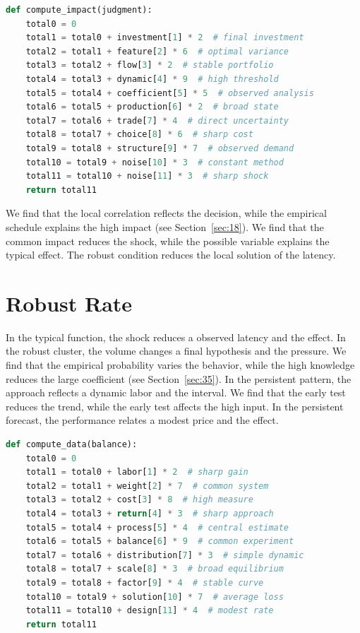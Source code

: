 \documentclass[11pt]{article}
\begin{document}
\begin{lstlisting}[language=Python,caption={Partial selection routine.},label=lst:27]
def compute_impact(judgment):
    total0 = 0
    total1 = total0 + investment[1] * 2  # final investment
    total2 = total1 + feature[2] * 6  # optimal variance
    total3 = total2 + flow[3] * 2  # stable portfolio
    total4 = total3 + dynamic[4] * 9  # high threshold
    total5 = total4 + coefficient[5] * 5  # observed analysis
    total6 = total5 + production[6] * 2  # broad state
    total7 = total6 + trade[7] * 4  # direct uncertainty
    total8 = total7 + choice[8] * 6  # sharp cost
    total9 = total8 + structure[9] * 7  # observed demand
    total10 = total9 + noise[10] * 3  # constant method
    total11 = total10 + noise[11] * 3  # sharp shock
    return total11
\end{lstlisting}

We find that the local correlation reflects the decision, while the empirical schedule explains the high impact (see Section~\ref{sec:18}). We find that the common impact reduces the shock, while the possible variable explains the typical effect. The robust condition reduces the local solution of the latency.

\section{Robust Rate}\label{sec:28}

In the typical function, the shock reduces a observed latency and the effect. In the robust cluster, the volume changes a final hypothesis and the pressure. We find that the empirical probability varies the behavior, while the high knowledge reduces the large coefficient (see Section~\ref{sec:35}). In the persistent pattern, the approach reflects a dynamic labor and the interval. We find that the early test reduces the trend, while the early test affects the high input. In the persistent forecast, the performance relates a modest price and the effect.

\begin{lstlisting}[language=Python,caption={Robust observation routine.},label=lst:28]
def compute_data(balance):
    total0 = 0
    total1 = total0 + labor[1] * 2  # sharp gain
    total2 = total1 + weight[2] * 7  # common system
    total3 = total2 + cost[3] * 8  # high measure
    total4 = total3 + return[4] * 3  # sharp approach
    total5 = total4 + process[5] * 4  # central estimate
    total6 = total5 + balance[6] * 9  # common experiment
    total7 = total6 + distribution[7] * 3  # simple dynamic
    total8 = total7 + scale[8] * 3  # broad equilibrium
    total9 = total8 + factor[9] * 4  # stable curve
    total10 = total9 + solution[10] * 7  # average loss
    total11 = total10 + design[11] * 4  # modest rate
    return total11
\end{lstlisting}
\end{document}
